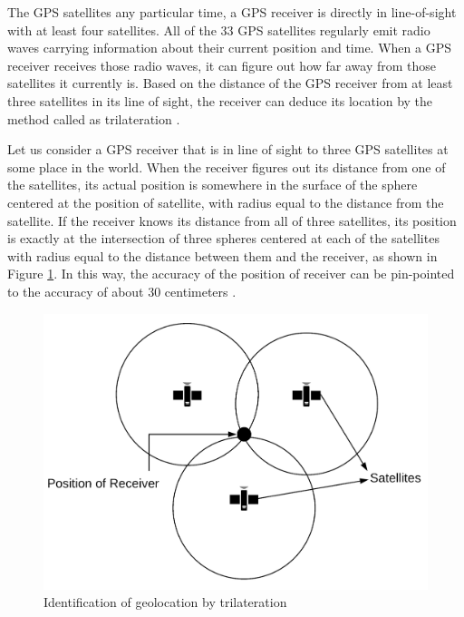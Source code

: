 \documentclass[12pt, a4paper, oneside]{article}
\begin{document}
The GPS satellites any particular time, a GPS receiver is directly in line-of-sight with at least four satellites. All of the 33 GPS satellites regularly emit radio waves carrying information about their current position and time. When a GPS receiver receives those radio waves, it can figure out how far away from those satellites it currently is. Based on the distance of the GPS receiver from at least three satellites in its line of sight, the receiver can deduce its location by the method called as trilateration \cite{gps}.

Let us consider a GPS receiver that is in line of sight to three GPS satellites at some place in the world. When the receiver figures out its distance from one of the satellites, its actual position is somewhere in the surface of the sphere centered at the position of satellite, with radius equal to the distance from the satellite. If the receiver knows its distance from all of three satellites, its position is exactly at the intersection of three spheres centered at each of the satellites with radius equal to the distance between them and the receiver, as shown in Figure \ref{fig:trilateration}. In this way, the accuracy of the position of receiver can be pin-pointed to the accuracy of about 30 centimeters \cite{gps}.

\begin{figure}[H]
	\includegraphics[width=0.5\linewidth]{trilateration.png}
	\centering
	\caption{Identification of geolocation by trilateration}
	\label{fig:trilateration}
\end{figure}
\end{document}
